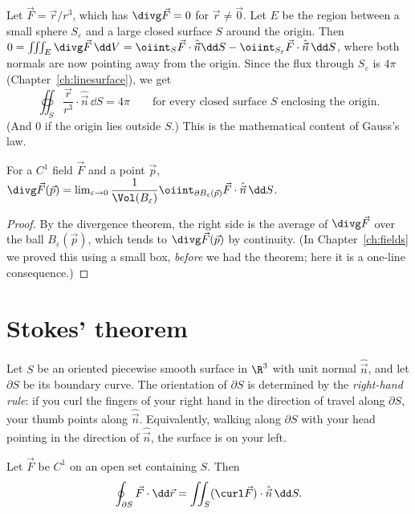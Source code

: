 \begin{example}
Let $\vec F=\vec r/r^3$, which has $\divg\vec F=0$ for $\vec r\ne\vec0$. Let $E$ be the region between a small sphere $S_\varepsilon$ and a large closed surface $S$ around the origin. Then $0=\iiint_E\divg\vec F\,\dd V=\oiint_S\vec F\cdot\hat{\vec n}\dd S-\oiint_{S_\varepsilon}\vec F\cdot\hat{\vec n}\,\dd S$, where both normals are now pointing away from the origin. Since the flux through $S_\varepsilon$ is $4\pi$ (Chapter~\ref{ch:linesurface}), we get
\[
\oiint_S\frac{\vec r}{r^3}\cdot\hat{\vec n}\,\dd S=4\pi\qquad\text{for every closed surface $S$ enclosing the origin.}
\]
(And $0$ if the origin lies outside $S$.) This is the mathematical content of Gauss's law.
\end{example}

\begin{theorem}
For a $C^1$ field $\vec F$ and a point $\vec p$, $\divg\vec F(\vec p)=\lim_{\varepsilon\to0}\dfrac1{\Vol(B_\varepsilon)}\oiint_{\partial B_\varepsilon(\vec p)}\vec F\cdot\hat{\vec n}\,\dd S$.
\end{theorem}

\begin{proof}
By the divergence theorem, the right side is the average of $\divg\vec F$ over the ball $B_\varepsilon(\vec p)$, which tends to $\divg\vec F(\vec p)$ by continuity. (In Chapter~\ref{ch:fields} we proved this using a small box, \emph{before} we had the theorem; here it is a one-line consequence.)
\end{proof}

\section{Stokes' theorem}

Let $S$ be an oriented piecewise smooth surface in $\R^3$ with unit normal $\hat{\vec n}$, and let $\partial S$ be its boundary curve. The orientation of $\partial S$ is determined by the \emph{right-hand rule}: if you curl the fingers of your right hand in the direction of travel along $\partial S$, your thumb points along $\hat{\vec n}$. Equivalently, walking along $\partial S$ with your head pointing in the direction of $\hat{\vec n}$, the surface is on your left.

\begin{theorem}\label{thm:stokes}
Let $\vec F$ be $C^1$ on an open set containing $S$. Then
\[
\oint_{\partial S}\vec F\cdot\dd\vec r=\iint_S(\curl\vec F)\cdot\hat{\vec n}\,\dd S .
\]
\end{theorem}

